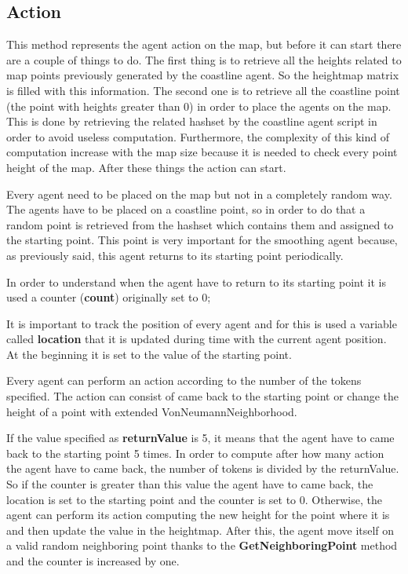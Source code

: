 \documentclass[12pt]{article}
\begin{document}
    \subsection{Action}
    This method represents the agent action on the map, but before it can start there are a couple of things to do.
    The first thing is to retrieve all the heights related to map points previously generated by the coastline agent. So the heightmap matrix is filled with this information.
    The second one is to retrieve all the coastline point (the point with heights greater than 0) in order to place the agents on the map. This is done by retrieving the
    related hashset by the coastline agent script in order to avoid useless computation. Furthermore, the complexity of this kind of computation increase with the map size 
    because it is needed to check every point height of the map.
    After these things the action can start.

    Every agent need to be placed on the map but not in a completely random way. The agents have to be placed on a coastline point, so in order to do that a random point is retrieved
    from the hashset which contains them and assigned to the starting point. This point is very important for the smoothing agent because, as previously said, this agent returns
    to its starting point periodically.

    In order to understand when the agent have to return to its starting point it is used a counter (\textbf{count}) originally set to 0;
    
    It is important to track the position of every agent and for this is used a variable called \textbf{location} that it is updated during time with the current agent position. 
    At the beginning it is set to the value of the starting point.

    Every agent can perform an action according to the number of the tokens specified. The action can consist of came back to the starting point or change the height of a point
    with extended VonNeumannNeighborhood.

    If the value specified as \textbf{returnValue} is 5, it means that the agent have to came back to the starting point 5 times. In order to compute after how many action the agent
    have to came back, the number of tokens is divided by the returnValue. So if the counter is greater than this value the agent have to came back, the location is set to the
    starting point and the counter is set to 0. Otherwise, the agent can perform its action computing the new height for the point where it is and then update the value in the heightmap.
    After this, the agent move itself on a valid random neighboring point thanks to the \textbf{GetNeighboringPoint} method and the counter is increased by one.
\end{document}

